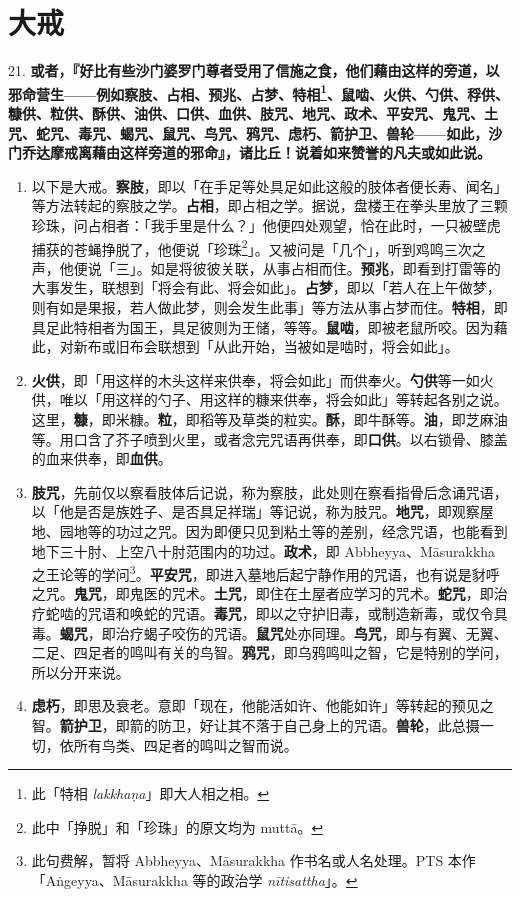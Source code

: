 \section{大戒}

{\Large 21.} \textbf{或者，『好比有些沙门婆罗门尊者受用了信施之食，他们藉由这样的旁道，以邪命营生——例如察肢、占相、预兆、占梦、特相\footnote{此「特相 \textit{lakkhaṇa}」即大人相之相。}、鼠啮、火供、勺供、稃供、糠供、粒供、酥供、油供、口供、血供、肢咒、地咒、政术、平安咒、鬼咒、土咒、蛇咒、毒咒、蝎咒、鼠咒、鸟咒、鸦咒、虑朽、箭护卫、兽轮——如此，沙门乔达摩戒离藉由这样旁道的邪命』，诸比丘！说着如来赞誉的凡夫或如此说。}

\begin{enumerate}\item 以下是大戒。\textbf{察肢}，即以「在手足等处具足如此这般的肢体者便长寿、闻名」等方法转起的察肢之学。\textbf{占相}，即占相之学。据说，盘楼王在拳头里放了三颗珍珠，问占相者：「我手里是什么？」他便四处观望，恰在此时，一只被壁虎捕获的苍蝇挣脱了，他便说「珍珠\footnote{此中「挣脱」和「珍珠」的原文均为 muttā。}」。又被问是「几个」，听到鸡鸣三次之声，他便说「三」。如是将彼彼关联，从事占相而住。\textbf{预兆}，即看到打雷等的大事发生，联想到「将会有此、将会如此」。\textbf{占梦}，即以「若人在上午做梦，则有如是果报，若人做此梦，则会发生此事」等方法从事占梦而住。\textbf{特相}，即具足此特相者为国王，具足彼则为王储，等等。\textbf{鼠啮}，即被老鼠所咬。因为藉此，对新布或旧布会联想到「从此开始，当被如是啮时，将会如此」。
\item \textbf{火供}，即「用这样的木头这样来供奉，将会如此」而供奉火。\textbf{勺供}等一如火供，唯以「用这样的勺子、用这样的糠来供奉，将会如此」等转起各别之说。这里，\textbf{糠}，即米糠。\textbf{粒}，即稻等及草类的粒实。\textbf{酥}，即牛酥等。\textbf{油}，即芝麻油等。用口含了芥子喷到火里，或者念完咒语再供奉，即\textbf{口供}。以右锁骨、膝盖的血来供奉，即\textbf{血供}。
\item \textbf{肢咒}，先前仅以察看肢体后记说，称为察肢，此处则在察看指骨后念诵咒语，以「他是否是族姓子、是否具足祥瑞」等记说，称为肢咒。\textbf{地咒}，即观察屋地、园地等的功过之咒。因为即便只见到粘土等的差别，经念咒语，也能看到地下三十肘、上空八十肘范围内的功过。\textbf{政术}，即 Abbheyya、Māsurakkha 之王论等的学问\footnote{此句费解，暂将 Abbheyya、Māsurakkha 作书名或人名处理。PTS 本作「Aṅgeyya、Māsurakkha 等的政治学 \textit{nītisattha}」。}。\textbf{平安咒}，即进入墓地后起宁静作用的咒语，也有说是豺呼之咒。\textbf{鬼咒}，即鬼医的咒术。\textbf{土咒}，即住在土屋者应学习的咒术。\textbf{蛇咒}，即治疗蛇啮的咒语和唤蛇的咒语。\textbf{毒咒}，即以之守护旧毒，或制造新毒，或仅令具毒。\textbf{蝎咒}，即治疗蝎子咬伤的咒语。\textbf{鼠咒}处亦同理。\textbf{鸟咒}，即与有翼、无翼、二足、四足者的鸣叫有关的鸟智。\textbf{鸦咒}，即乌鸦鸣叫之智，它是特别的学问，所以分开来说。
\item \textbf{虑朽}，即思及衰老。意即「现在，他能活如许、他能如许」等转起的预见之智。\textbf{箭护卫}，即箭的防卫，好让其不落于自己身上的咒语。\textbf{兽轮}，此总摄一切，依所有鸟类、四足者的鸣叫之智而说。\end{enumerate}

